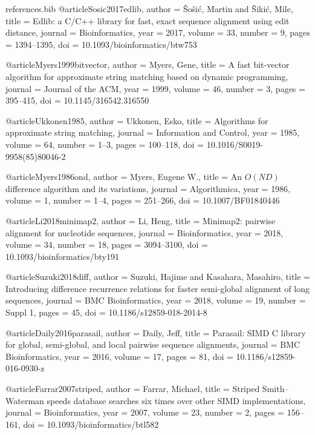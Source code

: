 \begin{filecontents*}[overwrite]{references.bib}
@article{Sosic2017edlib,
  author  = {{\v{S}}o{\v{s}}i{\'c}, Martin and {\v{S}}iki{\'c}, Mile},
  title   = {Edlib: a {C/C++} library for fast, exact sequence alignment using edit distance},
  journal = {Bioinformatics},
  year    = {2017},
  volume  = {33},
  number  = {9},
  pages   = {1394--1395},
  doi     = {10.1093/bioinformatics/btw753}
}

@article{Myers1999bitvector,
  author  = {Myers, Gene},
  title   = {A fast bit-vector algorithm for approximate string matching based on dynamic programming},
  journal = {Journal of the ACM},
  year    = {1999},
  volume  = {46},
  number  = {3},
  pages   = {395--415},
  doi     = {10.1145/316542.316550}
}

@article{Ukkonen1985,
  author  = {Ukkonen, Esko},
  title   = {Algorithms for approximate string matching},
  journal = {Information and Control},
  year    = {1985},
  volume  = {64},
  number  = {1--3},
  pages   = {100--118},
  doi     = {10.1016/S0019-9958(85)80046-2}
}

@article{Myers1986ond,
  author  = {Myers, Eugene W.},
  title   = {An {$O(ND)$} difference algorithm and its variations},
  journal = {Algorithmica},
  year    = {1986},
  volume  = {1},
  number  = {1--4},
  pages   = {251--266},
  doi     = {10.1007/BF01840446}
}

@article{Li2018minimap2,
  author  = {Li, Heng},
  title   = {Minimap2: pairwise alignment for nucleotide sequences},
  journal = {Bioinformatics},
  year    = {2018},
  volume  = {34},
  number  = {18},
  pages   = {3094--3100},
  doi     = {10.1093/bioinformatics/bty191}
}

@article{Suzuki2018diff,
  author  = {Suzuki, Hajime and Kasahara, Masahiro},
  title   = {Introducing difference recurrence relations for faster semi-global alignment of long sequences},
  journal = {BMC Bioinformatics},
  year    = {2018},
  volume  = {19},
  number  = {Suppl 1},
  pages   = {45},
  doi     = {10.1186/s12859-018-2014-8}
}

@article{Daily2016parasail,
  author  = {Daily, Jeff},
  title   = {Parasail: {SIMD} {C} library for global, semi-global, and local pairwise sequence alignments},
  journal = {BMC Bioinformatics},
  year    = {2016},
  volume  = {17},
  pages   = {81},
  doi     = {10.1186/s12859-016-0930-z}
}

@article{Farrar2007striped,
  author  = {Farrar, Michael},
  title   = {Striped {Smith--Waterman} speeds database searches six times over other {SIMD} implementations},
  journal = {Bioinformatics},
  year    = {2007},
  volume  = {23},
  number  = {2},
  pages   = {156--161},
  doi     = {10.1093/bioinformatics/btl582}
}


\end{filecontents*}
